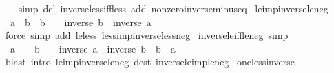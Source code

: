 \begin{isabellebody}
\ \ \isamarkupfalse%
\ {\isacharparenleft}{\kern0pt}simp\ del{\isacharcolon}{\kern0pt}\ inverse{\isacharunderscore}{\kern0pt}less{\isacharunderscore}{\kern0pt}iff{\isacharunderscore}{\kern0pt}less\ add{\isacharcolon}{\kern0pt}\ nonzero{\isacharunderscore}{\kern0pt}inverse{\isacharunderscore}{\kern0pt}minus{\isacharunderscore}{\kern0pt}eq{\isacharparenright}{\kern0pt}%
\endisatagproof
{\isafoldproof}%
%
\isadelimproof
\isanewline
%
\endisadelimproof
\isanewline
{}\isamarkupfalse%
\ le{\isacharunderscore}{\kern0pt}imp{\isacharunderscore}{\kern0pt}inverse{\isacharunderscore}{\kern0pt}le{\isacharunderscore}{\kern0pt}neg{\isacharcolon}{\kern0pt}\isanewline
\ \ {\isachardoublequoteopen}a\ {\isasymle}\ b\ {\isasymLongrightarrow}\ b\ {\isacharless}{\kern0pt}\ {}\ {\isasymLongrightarrow}\ inverse\ b\ {\isasymle}\ inverse\ a{\isachardoublequoteclose}\isanewline
%
\isadelimproof
\ \ %
\endisadelimproof
%
\isatagproof
{}\isamarkupfalse%
\ {\isacharparenleft}{\kern0pt}force\ simp\ add{\isacharcolon}{\kern0pt}\ le{\isacharunderscore}{\kern0pt}less\ less{\isacharunderscore}{\kern0pt}imp{\isacharunderscore}{\kern0pt}inverse{\isacharunderscore}{\kern0pt}less{\isacharunderscore}{\kern0pt}neg{\isacharparenright}{\kern0pt}%
\endisatagproof
{\isafoldproof}%
%
\isadelimproof
\isanewline
%
\endisadelimproof
\isanewline
{}\isamarkupfalse%
\ inverse{\isacharunderscore}{\kern0pt}le{\isacharunderscore}{\kern0pt}iff{\isacharunderscore}{\kern0pt}le{\isacharunderscore}{\kern0pt}neg\ {\isacharbrackleft}{\kern0pt}simp{\isacharbrackright}{\kern0pt}{\isacharcolon}{\kern0pt}\isanewline
\ \ {\isachardoublequoteopen}a\ {\isacharless}{\kern0pt}\ {}\ {\isasymLongrightarrow}\ b\ {\isacharless}{\kern0pt}\ {}\ {\isasymLongrightarrow}\ inverse\ a\ {\isasymle}\ inverse\ b\ {\isasymlongleftrightarrow}\ b\ {\isasymle}\ a{\isachardoublequoteclose}\isanewline
%
\isadelimproof
\ \ %
\endisadelimproof
%
\isatagproof
{}\isamarkupfalse%
\ {\isacharparenleft}{\kern0pt}blast\ intro{\isacharcolon}{\kern0pt}\ le{\isacharunderscore}{\kern0pt}imp{\isacharunderscore}{\kern0pt}inverse{\isacharunderscore}{\kern0pt}le{\isacharunderscore}{\kern0pt}neg\ dest{\isacharcolon}{\kern0pt}\ inverse{\isacharunderscore}{\kern0pt}le{\isacharunderscore}{\kern0pt}imp{\isacharunderscore}{\kern0pt}le{\isacharunderscore}{\kern0pt}neg{\isacharparenright}{\kern0pt}%
\endisatagproof
{\isafoldproof}%
%
\isadelimproof
\isanewline
%
\endisadelimproof
\isanewline
{}\isamarkupfalse%
\ one{\isacharunderscore}{\kern0pt}less{\isacharunderscore}{\kern0pt}inverse{\isacharcolon}{\kern0pt}\isanewline

\end{isabellebody}
